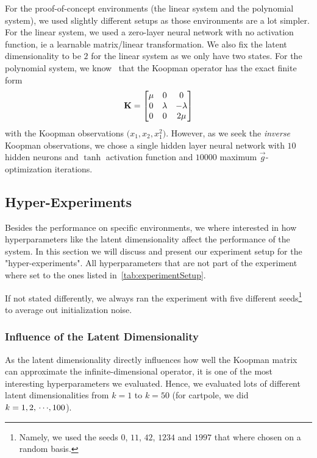 		For the proof-of-concept environments (the linear system and the polynomial system), we used slightly different setups as those environments are a lot simpler. For the linear system, we used a zero-layer neural network with no activation function, \ac{ie} a learnable matrix/linear transformation. We also fix the latent dimensionality to be \(2\) for the linear system as we only have two states. For the polynomial system, we know~\cite{williamsonLearningNonLinearDynamical2020} that the Koopman operator has the exact finite form
		\begin{equation*}
			\boldsymbol{\mathrm{K}} =
				\begin{bmatrix}
					\mu & 0       & 0        \\
					0   & \lambda & -\lambda \\
					0   & 0       & 2\mu
				\end{bmatrix}
		\end{equation*}
		with the Koopman observations \( \big(x_1, x_2, x_1^2\big) \). However, as we seek the \emph{inverse} Koopman observations, we chose a single hidden layer neural network with \(10\) hidden neurons and \(\tanh\) activation function and \(10000\) maximum \(\vec{g}\)-optimization iterations.

	\subsection{Hyper-Experiments}
		Besides the performance on specific environments, we where interested in how hyperparameters like the latent dimensionality affect the performance of the system. In this section we will discuss and present our experiment setup for the "hyper-experiments". All hyperparameters that are not part of the experiment where set to the ones listed in~\autoref{tab:experimentSetup}.

		If not stated differently, we always ran the experiment with five different seeds\footnote{Namely, we used the seeds \(0\), \(11\), \(42\), \(1234\) and \(1997\) that where chosen on a random basis.} to average out initialization noise.

		\subsubsection{Influence of the Latent Dimensionality}
			\label{subsec:experimentLatentDim}

			As the latent dimensionality directly influences how well the Koopman matrix can approximate the infinite-dimensional operator, it is one of the most interesting hyperparameters we evaluated. Hence, we evaluated lots of different latent dimensionalities from \( k = 1 \) to \( k = 50 \) (for cartpole, we did \( k = 1, 2, \,\cdots\!, 100 \)).

